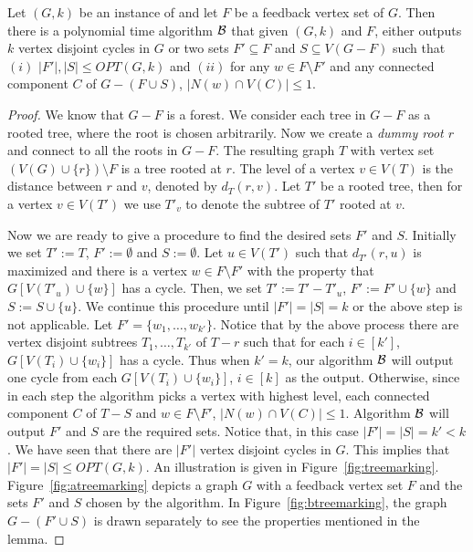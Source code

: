 \begin{lemma}
\label{lemma:mark_in_tree}
Let $(G,k)$ be an instance of \CP{} and let $F$ be a feedback vertex set of $G$. Then there is 
a polynomial time algorithm ${\cal B}$ that given $(G,k)$ and $F$, either outputs $k$ 
vertex disjoint cycles in $G$ or two sets $F'\subseteq F$ and $S\subseteq V(G-F)$ such that 
$(i)$ $\vert F'\vert, \vert S\vert \leq OPT(G,k)$ and $(ii)$ for any $w\in F \setminus F'$ and any connected component $C$ of $G-(F\cup S)$, 
$\vert N(w)\cap V(C)\vert \leq 1$. 
\end{lemma}
\begin{proof}
We know that $G-F$ is a forest. We consider each tree in $G-F$ as a rooted tree, where the root is chosen arbitrarily. Now we create a 
{\em dummy root $r$} and connect to all the roots in $G-F$. The resulting graph $T$ with vertex set $(V(G)\cup \{r\})\setminus F$ is 
a tree rooted at $r$. The level of a vertex $v\in V(T)$ is the distance between $r$ and $v$, denoted by $d_T(r,v)$. Let $T'$ be a rooted tree, then for a vertex $v\in V(T')$  
we use $T'_v$ to denote the subtree of $T'$ rooted at $v$.  

Now we are ready to give a procedure to find the desired sets 
$F'$ and $S$. Initially we set $T':=T$, $F':=\emptyset$ and $S:=\emptyset$. Let $u\in V(T')$ such that 
$d_{T'}(r,u)$ is maximized and there is a vertex $w\in F\setminus F'$ with the property that $G[V(T'_u)\cup \{w\}]$ has a cycle.  
Then, we set $T':=T'-T'_u$, $F':=F'\cup\{w\}$ and $S:=S\cup \{u\}$. We continue this procedure until $\vert F'\vert=\vert S \vert=k$ 
or the above step is not applicable. Let $F'=\{w_1,\ldots,w_{k'}\}$.
Notice that by the above process there are vertex disjoint subtrees 
$T_1,\ldots,T_{k'}$ of $T-r$  such that for each $i\in [k']$, $G[V(T_i)\cup \{w_i\}]$ has a cycle. 
Thus when $k'=k$, our algorithm 
${\cal B}$ will output one cycle from each $G[V(T_i)\cup \{w_i\}]$, $i\in [k]$ as the output. Otherwise, since in each step the 
algorithm picks a vertex with highest level, each connected component $C$ of $T-S$ and $w\in F \setminus F'$,  
$\vert N(w)\cap V(C)\vert \leq 1$. 
Algorithm ${\cal B}$ will output 
$F'$ and $S$ are the required sets. Notice that, in this case $\vert F'\vert=\vert S \vert =k'<k$. We have seen that there are $\vert F'\vert$ vertex disjoint cycles in $G$. This implies that   $\vert F'\vert=\vert S \vert \leq OPT(G,k)$.  An illustration is given in Figure~\ref{fig:treemarking}.  Figure~\ref{fig:atreemarking} depicts a graph $G$ with a feedback vertex set $F$ and 
the sets $F'$ and $S$ chosen by the algorithm. In Figure~\ref{fig:btreemarking}, the graph $G-(F'\cup S)$ is drawn separately 
to see the properties mentioned in the lemma.  
 
\end{proof}

